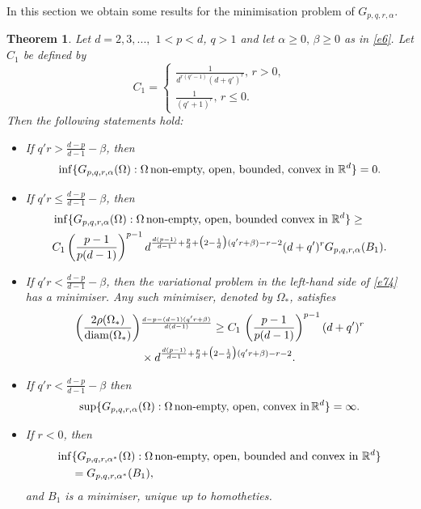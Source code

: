 \documentclass[a4paper,9pt]{article}
\newcommand{\R}{\mathbb{R}}
\newtheorem{theorem}{Theorem}
\newcommand{\Om}{\Omega}
\begin{document}
In this section we obtain some results for the minimisation problem of $G_{p,q,r,\alpha}$.
\begin{theorem}\label{the_min}    Let $d=2,3,...,$ $1<p<d$, $q>1$ and let $\alpha\ge0,\,\beta \ge0$ as in \eqref{e6}. Let $C_1$ be defined by
\begin{equation}
\label{c1}
C_1=\begin{cases}
\frac{1}{d^{r(q'-1)}(d+q')^r}, \, r>0,\\
 \frac{1}{(q'+1)^r}, \, r\le 0.
\end{cases}
\end{equation}
Then  the following statements hold:
\begin{itemize}
\item[\textup{(i)}]If $q'r>\displaystyle\frac{d-p}{d-1}-\beta$, then
$$\inf\{G_{p,q,r,\alpha}(\Om): \Om\,\textup{non-empty, open, bounded, convex in $\R^d$} \}=0.$$
\item[\textup{(ii)}] If $q'r\le\displaystyle \frac{d-p}{d-1}-\beta$, then
\begin{align}\label{e74}
&\inf\{G_{p,q,r,\alpha}(\Om): \Om\,\textup{non-empty, open, bounded convex in $\R^d$} \}\ge\nonumber\\& C_1\left( \frac{p-1}{p(d-1)}\right)^{p-1}d^{\frac{d(p-1)}{d-1}+\frac{p}{d}+\big(2-\frac1d\big)(q'r+\beta)-r-2}(d+q')^r G_{p,q,r,\alpha}(B_1).
\end{align}
\item[\textup{(iii)}]If $q'r<\displaystyle \frac{d-p}{d-1}-\beta$,
then the variational problem in the left-hand side of \eqref{e74} has a minimiser. Any such  minimiser, denoted by $\Omega_*$, satisfies
\begin{align*}
\left(\frac{2\rho(\Om_*)}{\textup{diam}(\Om_*)}\right)&^{\frac{d-p-(d-1)(q'r+\beta)}{d(d-1)}}\ge  C_1 \,\left( \frac{p-1}{p(d-1)}\right)^{p-1}(d+q')^r\nonumber\\&\times  d^{\frac{d(p-1)}{d-1}+\frac{p}{d}+\big(2-\frac1d\big)(q'r+\beta)-r-2}.
\end{align*}
 \item [\textup{(iv)}] If $q'r<\displaystyle \frac{d-p}{d-1}-\beta$ then
\begin{equation*}
\sup \{G_{p,q,r,\alpha}(\Om): \Om\, \textup{non-empty, open, convex in}\,\R^d \}=\infty.
\end{equation*}
 \item [\textup{(v)}] If $r<0$, then
\begin{align*}\inf &\{G_{p,q,r,\alpha^*}(\Om): \Om\,\textup{non-empty, open, bounded and convex in $\R^d$} \}\nonumber\\&=G_{p,q,r,\alpha^*}(B_1),
\end{align*}
and $B_1$ is a minimiser, unique up to homotheties.
\end{itemize}
\end{theorem}
\end{document}

